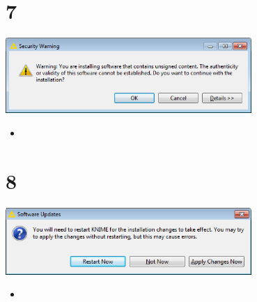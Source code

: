 \documentclass{beamer}
\begin{document}
\section{7}
\begin{frame}
	\begin{center}
  		\includegraphics[width=0.7\textwidth]{7.png}
	\end{center}
	\begin{itemize}
		\item
	\end{itemize}
\end{frame}

\section{8}
\begin{frame}
	\begin{center}
  		\includegraphics[width=0.7\textwidth]{8.png}
	\end{center}
	\begin{itemize}
		\item
	\end{itemize}
\end{frame}
\end{document}
